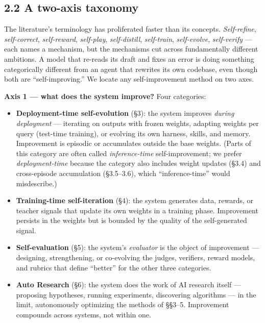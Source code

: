 \documentclass[
  11pt,
]{article}
\providecommand{\tightlist}{%
  \setlength{\itemsep}{0pt}\setlength{\parskip}{0pt}}
\begin{document}
\subsection{2.2 A two-axis taxonomy}\label{a-two-axis-taxonomy}

The literature's terminology has proliferated faster than its concepts.
\emph{Self-refine}, \emph{self-correct}, \emph{self-reward},
\emph{self-play}, \emph{self-distill}, \emph{self-train},
\emph{self-evolve}, \emph{self-verify} --- each names a mechanism, but
the mechanisms cut across fundamentally different ambitions. A model
that re-reads its draft and fixes an error is doing something
categorically different from an agent that rewrites its own codebase,
even though both are ``self-improving.'' We locate any self-improvement
method on two axes.

\textbf{Axis 1 --- what does the system improve?} Four categories:

\begin{itemize}
\tightlist
\item
  \textbf{Deployment-time self-evolution} (§3): the system improves
  \emph{during deployment} --- iterating on outputs with frozen weights,
  adapting weights per query (test-time training), or evolving its own
  harness, skills, and memory. Improvement is episodic or accumulates
  outside the base weights. (Parts of this category are often called
  \emph{inference-time} self-improvement; we prefer
  \emph{deployment-time} because the category also includes weight
  updates (§3.4) and cross-episode accumulation (§3.5--3.6), which
  ``inference-time'' would misdescribe.)
\item
  \textbf{Training-time self-iteration} (§4): the system generates data,
  rewards, or teacher signals that update its own weights in a training
  phase. Improvement persists in the weights but is bounded by the
  quality of the self-generated signal.
\item
  \textbf{Self-evaluation} (§5): the system's \emph{evaluator} is the
  object of improvement --- designing, strengthening, or co-evolving the
  judges, verifiers, reward models, and rubrics that define ``better''
  for the other three categories.
\item
  \textbf{Auto Research} (§6): the system does the work of AI research
  itself --- proposing hypotheses, running experiments, discovering
  algorithms --- in the limit, autonomously optimizing the methods of
  §§3--5. Improvement compounds across systems, not within one.
\end{itemize}
\end{document}
